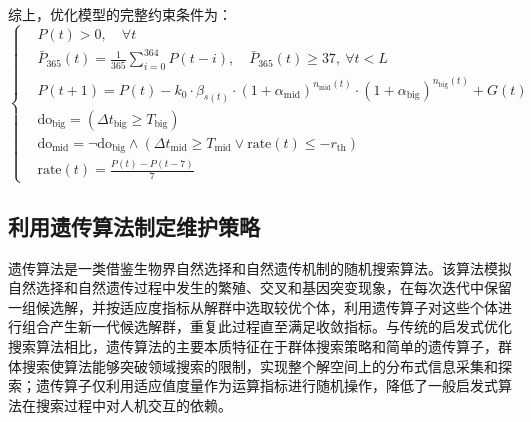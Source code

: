 \documentclass[withoutpreface,bwprint]{cumcmthesis}
\begin{document}
综上，优化模型的完整约束条件为：
\[
	\left\{
	\begin{aligned}
		& P(t) > 0, \quad \forall t \\[4pt]
		& \bar{P}_{365}(t) = \frac{1}{365}\sum_{i=0}^{364} P(t-i), \quad \bar{P}_{365}(t) \geq 37,\ \forall t < L \\[4pt]
		& P(t+1) = P(t) - k_0 \cdot \beta_{s(t)} \cdot (1+\alpha_{\text{mid}})^{n_{\text{mid}}(t)} \cdot (1+\alpha_{\text{big}})^{n_{\text{big}}(t)} + G(t) \\[4pt]
		& \text{do}_{\text{big}} = \left( \Delta t_{\text{big}} \geq T_{\text{big}} \right) \\[4pt]
		& \text{do}_{\text{mid}} = \neg \text{do}_{\text{big}} \land \left( \Delta t_{\text{mid}} \geq T_{\text{mid}} \lor \text{rate}(t) \leq -r_{\text{th}} \right) \\[4pt]
		& \text{rate}(t) = \frac{P(t) - P(t-7)}{7}
	\end{aligned}
	\right.
\]

\subsection{利用遗传算法制定维护策略}

遗传算法是一类借鉴生物界自然选择和自然遗传机制的随机搜索算法。该算法模拟自然选择和自然遗传过程中发生的繁殖、交叉和基因突变现象，在每次迭代中保留一组候选解，并按适应度指标从解群中选取较优个体，利用遗传算子对这些个体进行组合产生新一代候选解群，重复此过程直至满足收敛指标。与传统的启发式优化搜索算法相比，遗传算法的主要本质特征在于群体搜索策略和简单的遗传算子，群体搜索使算法能够突破领域搜索的限制，实现整个解空间上的分布式信息采集和探索；遗传算子仅利用适应值度量作为运算指标进行随机操作，降低了一般启发式算法在搜索过程中对人机交互的依赖。
\end{document}
